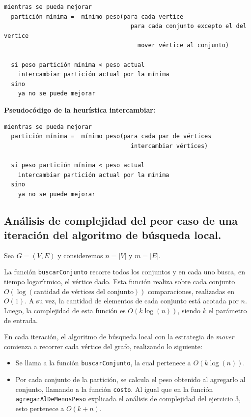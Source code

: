 \begin{verbatim}
mientras se pueda mejorar
  partición mínima =  mínimo peso(para cada vertice
                                    para cada conjunto excepto el del vertice
                                      mover vértice al conjunto)

  si peso partición mínima < peso actual
    intercambiar partición actual por la mínima
  sino
    ya no se puede mejorar
\end{verbatim}

\textbf{Pseudocódigo de la heurística intercambiar:}

\vspace*{0.3cm}

\begin{verbatim}
mientras se pueda mejorar
  partición mínima =  mínimo peso(para cada par de vértices
                                    intercambiar vértices)

  si peso partición mínima < peso actual
    intercambiar partición actual por la mínima
  sino
    ya no se puede mejorar
\end{verbatim}



\newpage
\subsection{Análisis de complejidad del peor caso de una iteración del
            algoritmo de búsqueda local.}
\vspace*{0.3cm}

Sea $G = (V,E)$ y consideremos $n = |V|$ y $m = |E|$.

La función \texttt{buscarConjunto} recorre todos los conjuntos y en cada uno
busca, en tiempo logarítmico, el vértice dado. Esta función realiza sobre cada
conjunto $O(\log(\text{cantidad de vértices del conjunto}))$ comparaciones,
realizadas en $O(1)$. A su vez, la cantidad de elementos de cada conjunto está
acotada por $n$. Luego, la complejidad de esta función es $O(k\log(n))$, siendo
$k$ el parámetro de entrada.

\vspace*{0.3cm}

En cada iteración, el algoritmo de búsqueda local con la estrategia de
\textit{mover} comienza a recorrer cada vértice del grafo, realizando lo siguiente:
\begin{itemize}
  \item Se llama a la función \texttt{buscarConjunto}, la cual pertenece a
  $O(k\log(n))$.

  \item Por cada conjunto de la partición, se calcula el peso obtenido al
  agregarlo al conjunto, llamando a la función \texttt{costo}. Al igual que en
  la función \texttt{agregarAlDeMenosPeso} explicada el análisis de complejidad del ejercicio 3, esto pertenece a $O(k + n)$.
\end{itemize}

